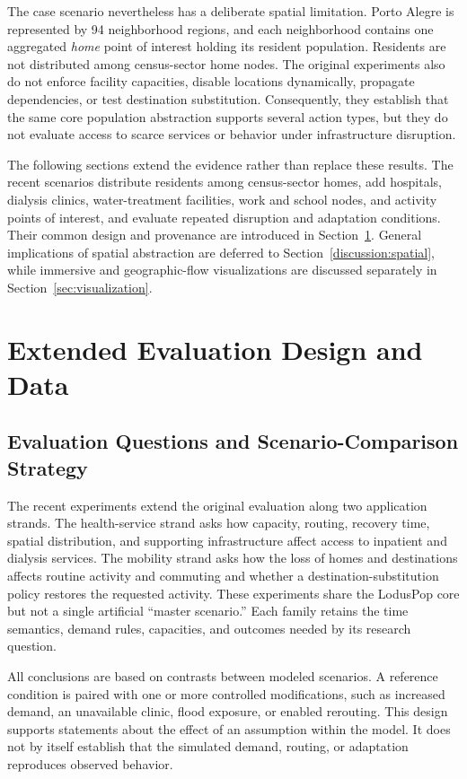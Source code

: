 \documentclass[pdflatex,sn-mathphys-num]{sn-jnl}%
\theoremstyle{thmstyleone}%
\theoremstyle{thmstyletwo}%
\theoremstyle{thmstylethree}%
\begin{document}
The case scenario nevertheless has a deliberate spatial limitation. Porto Alegre is represented by 94 neighborhood regions, and each neighborhood contains one aggregated \textit{home} point of interest holding its resident population. Residents are not distributed among census-sector home nodes. The original experiments also do not enforce facility capacities, disable locations dynamically, propagate dependencies, or test destination substitution. Consequently, they establish that the same core population abstraction supports several action types, but they do not evaluate access to scarce services or behavior under infrastructure disruption.

The following sections extend the evidence rather than replace these results. The recent scenarios distribute residents among census-sector homes, add hospitals, dialysis clinics, water-treatment facilities, work and school nodes, and activity points of interest, and evaluate repeated disruption and adaptation conditions. Their common design and provenance are introduced in Section~\ref{sec:extended_evaluation}. General implications of spatial abstraction are deferred to Section~\ref{discussion:spatial}, while immersive and geographic-flow visualizations are discussed separately in Section~\ref{sec:visualization}.

\section{Extended Evaluation Design and Data}
\label{sec:extended_evaluation}

\subsection{Evaluation Questions and Scenario-Comparison Strategy}

The recent experiments extend the original evaluation along two application strands. The health-service strand asks how capacity, routing, recovery time, spatial distribution, and supporting infrastructure affect access to inpatient and dialysis services. The mobility strand asks how the loss of homes and destinations affects routine activity and commuting and whether a destination-substitution policy restores the requested activity. These experiments share the LodusPop core but not a single artificial ``master scenario.'' Each family retains the time semantics, demand rules, capacities, and outcomes needed by its research question.

All conclusions are based on contrasts between modeled scenarios. A reference condition is paired with one or more controlled modifications, such as increased demand, an unavailable clinic, flood exposure, or enabled rerouting. This design supports statements about the effect of an assumption within the model. It does not by itself establish that the simulated demand, routing, or adaptation reproduces observed behavior.
\end{document}

